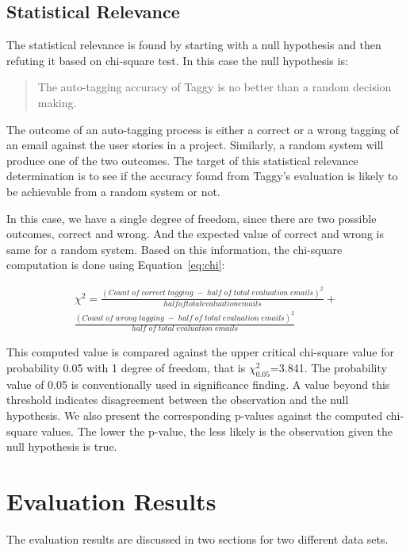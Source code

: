 \subsection{Statistical Relevance}
The statistical relevance is found by starting with a null hypothesis and then refuting it based on chi-square test. In this case the null hypothesis is:

\begin{quote}
	The auto-tagging accuracy of Taggy is no better than a random decision making.
\end{quote}

The outcome of an auto-tagging process is either a correct or a wrong tagging of an email against the user stories in a project. Similarly, a random system will produce one of the two outcomes. The target of this statistical relevance determination is to see if the accuracy found from Taggy's evaluation is likely to be achievable from a random system or not.

In this case, we have a single degree of freedom, since there are two possible outcomes, correct and wrong. And the expected value of correct and wrong is same for a random system. Based on this information, the chi-square computation is done using Equation~\ref{eq:chi}:



\begin{equation}
\label{eq:chi}
\begin{split}
	\chi ^ 2 = \frac {(Count \; of \; correct \; tagging \; - \; half \; of \; total \; evaluation \; emails) ^ 2} {half of total evaluation emails} +  	
\\
	\frac{(Count \; of \; wrong \; tagging \; - \; half \; of \; total \; evaluation \; emails)  ^ 2} {half \; of \; total \; evaluation \; emails}
\end{split}	
\end{equation}                                       

This computed value is compared against the upper critical chi-square value for probability 0.05 with 1 degree of freedom, that is $\chi^{2}_{0.05}$=3.841. The probability value of 0.05 is conventionally used in significance finding. A value beyond this threshold indicates disagreement between the observation and the null hypothesis. We also present the corresponding p-values against the computed chi-square values. The lower the p-value, the less likely is the observation given the null hypothesis is true.

\section{Evaluation Results}
The evaluation results are discussed in two sections for two different data sets.

